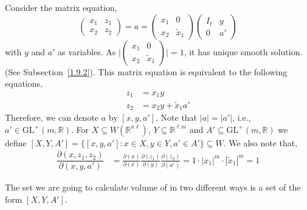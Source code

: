 \documentclass[11pt]{article}
\theoremstyle{definition}
\begin{document}
Consider the matrix equation,
\begin{equation}\label{eq1.12}
    \begin{pmatrix}
        x_1 & z_1  \\
        x_2 & z_2
    \end{pmatrix}
    =a=
    \begin{pmatrix}
        x_1 & 0  \\
        x_2 & \widetilde{x}_1
    \end{pmatrix}
    \begin{pmatrix}
        I_\ell & y  \\
        0      & a'
    \end{pmatrix}
\end{equation}
with $y$ and $a'$ as variables.
As $\bigg|
\begin{pmatrix}
    x_1 & 0  \\
    x_2 & \widetilde{x}_1
\end{pmatrix} \bigg| =1$, it has unique smooth solution.
(See Subsection~\ref{1.9.2}).
This matrix equation is equivalent to the following equations,
\begin{equation}\label{eq1.13}
    \begin{split}
        z_1 &= x_1y\\
        z_2 &= x_2y + \widetilde{x}_1 a'
    \end{split}
\end{equation}
Therefore, we can denote $a$ by $[x,y,  a']$.
Note that $|a|=|a'|$, i.e., $a' \in \mathrm{GL}^+(m, \mathbb{R})$.
For $X \subseteq W(\mathbb{R}^{n\ell })$, $Y \subseteq \mathbb{R}^{\ell m}$ and $A' \subseteq \mathrm{GL}^+(m, \mathbb{R})$ we define $[X,Y,A']=\{[x,y, a']: x \in X, y \in Y, a' \in A'\} \subseteq W$.
We also note that,
\begin{align}\label{eq1.14}
    \dfrac{\partial (x, z_1, z_2)}{\partial (x, y, a')} &= \frac{\partial (x)}{\partial (x)} \frac{\partial (z_1)}{\partial (y)} \frac{\partial (z_2)}{\partial (a')} = 1 \cdot |x_1|^m \cdot |\widetilde{x}_1|^m = 1
\end{align}

The set we are going to calculate volume of in two different ways is a set of the form $[X,Y,A']$.
\end{document}
